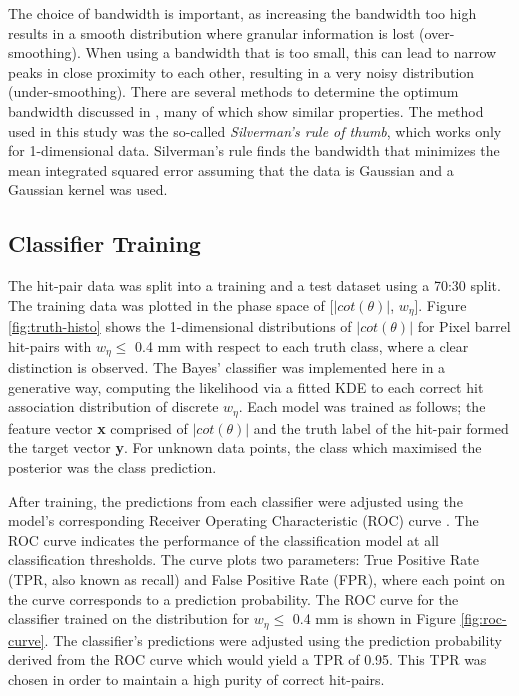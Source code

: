 The choice of bandwidth is important, as increasing the bandwidth too high results in a smooth distribution where granular information is lost (over-smoothing). When using a bandwidth that is too small, this can lead to narrow peaks in close proximity to each other, resulting in a very noisy distribution (under-smoothing). There are several methods to determine the optimum bandwidth discussed in \cite{bandwidth-selection-methods}, many of which show similar properties. The method used in this study was the so-called \textit{Silverman's rule of thumb}, which works only for 1-dimensional data. Silverman's rule finds the bandwidth that minimizes the mean integrated squared error assuming that the data is Gaussian and a Gaussian kernel was used.

\newpage
\subsection{Classifier Training}

The hit-pair data was split into a training and a test dataset using a 70:30 split. The training data was plotted in the phase space of [$|cot(\theta)|$, $w_{\eta}$]. Figure \ref{fig:truth-histo} shows the 1-dimensional distributions of $|cot(\theta)|$ for Pixel barrel hit-pairs with $w_{\eta} \le$ 0.4 mm with respect to each truth class, where a clear distinction is observed. The Bayes’ classifier was implemented here in a generative way, computing the likelihood via a fitted KDE to each correct hit association distribution of discrete $w_{\eta}$. Each model was trained as follows; the feature vector \textbf{x} comprised of $|cot(\theta)|$ and the truth label of the hit-pair formed the target vector \textbf{y}. For unknown data points, the class which maximised the posterior was the class prediction.

After training, the predictions from each classifier were adjusted using the model's corresponding Receiver Operating Characteristic (ROC) curve \cite{Davis2006-oh}. The ROC curve indicates the performance of the classification model at all classification thresholds. The curve plots two parameters: True Positive Rate (TPR, also known as recall) and False Positive Rate (FPR), where each point on the curve corresponds to a prediction probability. The ROC curve for the classifier trained on the distribution for $w_{\eta} \le$ 0.4 mm is shown in Figure \ref{fig:roc-curve}. The classifier’s predictions were adjusted using the prediction probability derived from the ROC curve which would yield a TPR of 0.95. This TPR was chosen in order to maintain a high purity of correct hit-pairs. 

